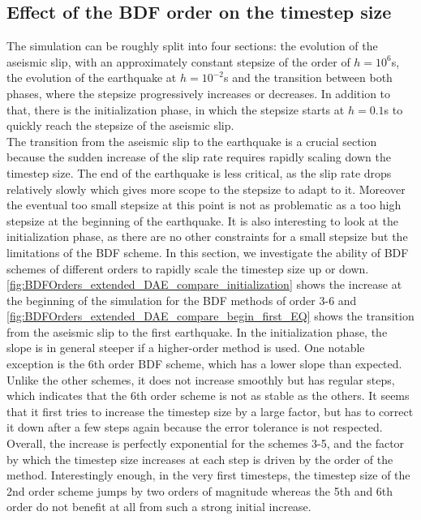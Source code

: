 \subsection{Effect of the BDF order on the timestep size}
The simulation can be roughly split into four sections: the evolution of the aseismic slip, with an approximately constant stepsize of the order of $h=10^6$s, the evolution of the earthquake at $h=10^{-2}$s and the transition between both phases, where the stepsize progressively increases or decreases. In addition to that, there is the initialization phase, in which the stepsize starts at $h=0.1$s to quickly reach the stepsize of the aseismic slip. \\
The transition from the aseismic slip to the earthquake is a crucial section because the sudden increase of the slip rate requires rapidly scaling down the timestep size. The end of the earthquake is less critical, as the slip rate drops relatively slowly which gives more scope to the stepsize to adapt to it. Moreover the eventual too small stepsize at this point is not as problematic as a too high stepsize at the beginning of the earthquake. It is also interesting to look at the initialization phase, as there are no other constraints for a small stepsize but the limitations of the BDF scheme. In this section, we investigate the ability of BDF schemes of different orders to rapidly scale the timestep size up or down. \\
\autoref{fig:BDFOrders_extended_DAE_compare_initialization} shows the increase at the beginning of the simulation for the BDF methods of order 3-6 and \autoref{fig:BDFOrders_extended_DAE_compare_begin_first_EQ} shows the transition from the aseismic slip to the first earthquake. In the initialization phase, the slope is in general steeper if a higher-order method is used. One notable exception is the 6th order BDF scheme, which has a lower slope than expected. Unlike the other schemes, it does not increase smoothly but has regular steps, which indicates that the 6th order scheme is not as stable as the others. It seems that it first tries to increase the timestep size by a large factor, but has to correct it down after a few steps again because the error tolerance is not respected. Overall, the increase is perfectly exponential for the schemes 3-5, and the factor by which the timestep size increases at each step is driven by the order of the method. Interestingly enough, in the very first timesteps,  the timestep size of the 2nd order scheme jumps by two orders of magnitude whereas the 5th and 6th order do not benefit at all from such a strong initial increase. 

